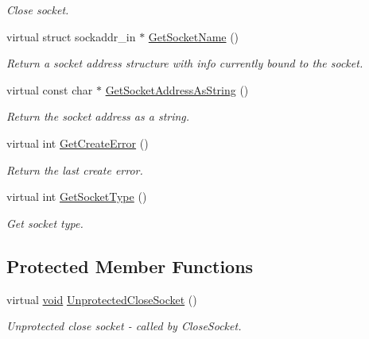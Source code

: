 \begin{DoxyCompactItemize}
\begin{DoxyCompactList}\small\item\em \-Close socket. \end{DoxyCompactList}\item 
virtual struct sockaddr\-\_\-in $\ast$ \hyperlink{class_c_base_socket_a6f955956a1cd1c94c3ba2a80c1fde41a}{\-Get\-Socket\-Name} ()
\begin{DoxyCompactList}\small\item\em \-Return a socket address structure with info currently bound to the socket. \end{DoxyCompactList}\item 
virtual const char $\ast$ \hyperlink{class_c_base_socket_a78dee8076bd41f62307d70273112b54a}{\-Get\-Socket\-Address\-As\-String} ()
\begin{DoxyCompactList}\small\item\em \-Return the socket address as a string. \end{DoxyCompactList}\item 
virtual int \hyperlink{class_c_base_socket_abae300062e0510d901e2873eface1bc0}{\-Get\-Create\-Error} ()
\begin{DoxyCompactList}\small\item\em \-Return the last create error. \end{DoxyCompactList}\item 
virtual int \hyperlink{class_c_base_socket_a4a6c7866671c019612259f30172cc8c5}{\-Get\-Socket\-Type} ()
\begin{DoxyCompactList}\small\item\em \-Get socket type. \end{DoxyCompactList}\end{DoxyCompactItemize}
\subsection*{\-Protected \-Member \-Functions}
\begin{DoxyCompactItemize}
\item 
virtual \hyperlink{_cpclient_8h_a6464f7480a0fd0ee170cba12b2c0497f}{void} \hyperlink{class_c_base_socket_ab3e4b93f8450b5fa901017d5fddba0e2}{\-Unprotected\-Close\-Socket} ()
\begin{DoxyCompactList}\small\item\em \-Unprotected close socket -\/ called by \-Close\-Socket. \end{DoxyCompactList}\end{DoxyCompactItemize}
